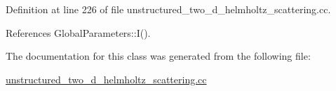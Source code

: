 Definition at line 226 of file unstructured\+\_\+two\+\_\+d\+\_\+helmholtz\+\_\+scattering.\+cc.



References Global\+Parameters\+::\+I().



The documentation for this class was generated from the following file\+:\begin{DoxyCompactItemize}
\item 
\hyperlink{unstructured__two__d__helmholtz__scattering_8cc}{unstructured\+\_\+two\+\_\+d\+\_\+helmholtz\+\_\+scattering.\+cc}\end{DoxyCompactItemize}
